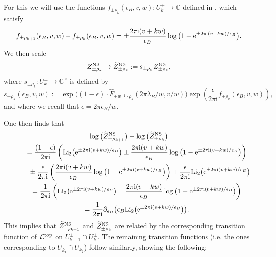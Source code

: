 \documentclass[pdftex]{sigma}
\numberwithin{equation}{section}
\begin{document}
For this we will use the functions $f_{\pm \rho_k}(\epsilon_B,v,w)\colon U_k^{\pm} \to \mathbb{C}$ defined in \cite[Lemma 4.18]{ASTT21}, which satisfy
\begin{equation*}
 f_{\pm \rho_{k+1}}(\epsilon_B,v,w)-f_{\pm \rho_k}(\epsilon_B,v,w)=\pm \frac{2\pi \mathrm{i}(v+kw)}{\epsilon_B}\log\big(1-{\rm e}^{\pm 2\pi \mathrm{i}(v+kw)/\epsilon_B}\big).
\end{equation*}
We then scale
\begin{equation*}
 Z_{\pm \rho_k}^{\rm NS}\to \widetilde{Z}_{\pm \rho_k}^{\rm NS}:=s_{\pm \rho_k}Z_{\pm \rho_k}^{\rm NS},
\end{equation*}
where $s_{\pm \rho_k}\colon U_k^{\pm} \to \mathbb{C}^{\times}$ is defined by
\begin{equation*}
 s_{\pm \rho_k}(\epsilon_B,v,w):=\exp\big((1-\epsilon)\cdot\widehat{F}_{\pm w^{-1}\cdot \rho_k}(2\pi\lambda_B/w, v/w)\big) \exp\left(\frac{\epsilon}{2\pi \mathrm{i}}f_{\pm \rho_k}(\epsilon_B,v,w) \right),
\end{equation*}
and where we recall that $\epsilon=2\pi \epsilon_B/w$.

One then finds that
\begin{gather*}
 \log\big(\widetilde{Z}_{\pm \rho_{k+1}}^{\rm NS}\big) -\log\big(\widetilde{Z}_{\pm \rho_k}^{\rm NS}\big) \\
 \qquad{} = \frac{(1-\epsilon)}{2\pi \mathrm{i}}\left(\mathrm{Li}_2\big({\rm e}^{ \pm 2\pi \mathrm{i}(v+kw)/\epsilon_B}\big)\pm \frac{ 2\pi \mathrm{i}(v+kw)}{\epsilon_B}\log\big(1-{\rm e}^{ \pm 2\pi \mathrm{i}(v+kw)/\epsilon_B}\big)\right)\\
 \qquad\quad{} \pm \frac{\epsilon}{2\pi \mathrm{i}}\left(\frac{2\pi \mathrm{i}(v+kw)}{\epsilon_B}\log\big(1-{\rm e}^{\pm 2\pi \mathrm{i}(v+kw)/\epsilon_B}\big)\right)
 +\frac{\epsilon}{2\pi \mathrm{i}}\mathrm{Li}_2\big({\rm e}^{\pm 2\pi \mathrm{i}(v+kw)/\epsilon_B}\big)\\
\qquad{} = \frac{1}{2\pi \mathrm{i}}\left(\mathrm{Li}_2\big({\rm e}^{\pm 2\pi \mathrm{i}(v+kw)/\epsilon_B}\big)\pm \frac{2\pi \mathrm{i}(v+kw)}{\epsilon_B}\log\big(1-{\rm e}^{\pm 2\pi \mathrm{i}(v+kw)/\epsilon_B}\big)\right)\\
 \qquad{} = \frac{1}{2\pi \mathrm{i}} \partial_{\epsilon_B}\big(\epsilon_B \mathrm{Li}_2\big({\rm e}^{\pm 2\pi \mathrm{i}(v+kw)/\epsilon_B}\big)\big).
 \end{gather*}
This implies that $\widetilde{Z}_{\pm \rho_{k+1}}^{\rm NS}$ and $\widetilde{Z}_{\pm \rho_{k}}^{\rm NS}$ are related by the corresponding transition function of $\mathcal{L}^{{\rm top}}$ on $U_{k+1}^{\pm}\cap U_{k}^{\pm}$. The remaining transition functions (i.e. the ones corresponding to $U_{k_1}^{+}\cap U_{k_2}^{-}$) follow similarly, showing the following:
\end{document}
